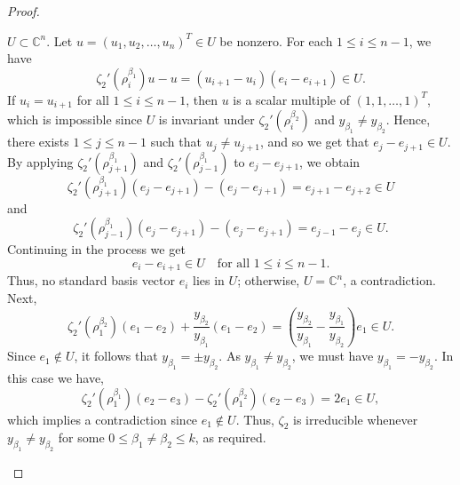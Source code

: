 \documentclass[preprint]{elsarticle}
\begin{document}
\begin{proof}
\begin{itemize}
$U \subset \mathbb{C}^n$.
Let $u=(u_1,u_2,\ldots,u_n)^T \in U$ be nonzero. For each $1 \le i \le n-1$, we have
\[
\zeta_2'(\rho_i^{\beta_1})u - u
= (u_{i+1}-u_i)(e_i-e_{i+1}) \in U.
\]
If $u_i=u_{i+1}$ for all $1\leq i\leq n-1$, then $u$ is a scalar multiple of
$(1,1,\ldots,1)^T$, which is impossible since
$U$ is invariant under $\zeta_2'(\rho_i^{\beta_2})$ and
$y_{\beta_1} \neq y_{\beta_2}$.
Hence, there exists $1 \le j \le n-1$ such that $u_j\neq u_{j+1}$, and so we get that $e_j-e_{j+1} \in U$.
By applying $\zeta_2'(\rho_{j+1}^{\beta_1})$
and $\zeta_2'(\rho_{j-1}^{\beta_1})$ to $e_j-e_{j+1}$, we obtain
$$
\zeta_2'(\rho_{j+1}^{\beta_1})(e_j - e_{j+1})-(e_j - e_{j+1}) = e_{j+1} - e_{j+2} \in U
$$ 
and
$$\zeta_2'(\rho_{j-1}^{\beta_1})(e_j - e_{j+1})-(e_j - e_{j+1}) = e_{j-1} - e_j \in U.
$$
Continuing in the process we get 
\[
e_i-e_{i+1} \in U \quad \text{for all } 1 \le i \le n-1.
\]
Thus, no standard basis vector $e_i$ lies in $U$; otherwise,
$U=\mathbb{C}^n$, a contradiction.
Next,
\[
\zeta_2'(\rho_1^{\beta_2})(e_1-e_2)
+ \dfrac{y_{\beta_2}}{y_{\beta_1}}(e_1-e_2)
= \left(\dfrac{y_{\beta_2}}{y_{\beta_1}}
- \dfrac{y_{\beta_1}}{y_{\beta_2}}\right)e_1 \in U.
\]
Since $e_1 \notin U$, it follows that
$y_{\beta_1}=\pm y_{\beta_2}$.
As $y_{\beta_1}\neq y_{\beta_2}$, we must have
$y_{\beta_1}=-y_{\beta_2}$.
In this case we have,
\[
\zeta_2'(\rho_1^{\beta_1})(e_2-e_3)
-\zeta_2'(\rho_1^{\beta_2})(e_2-e_3)=2e_1 \in U,
\]
which implies a contradiction since $e_1\notin U$. Thus, $\zeta_2$ is irreducible whenever
$y_{\beta_1}\neq y_{\beta_2}$ for some $0\leq \beta_1 \neq \beta_2\leq k$, as required.\vspace{0.1cm}


\end{itemize}
\end{proof}
\end{document}
